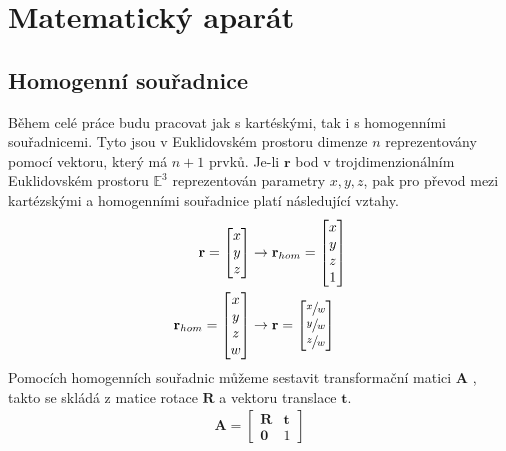 \documentclass[twoside]{ctuthesis}
\newcommand{\tl}[1]{$\mathbf{#1}$}
\begin{document}
\maketitle

\chapter{Matematický aparát}
\section{Homogenní souřadnice}
Během celé práce budu pracovat jak s kartéskými, tak i s homogenními souřadnicemi. Tyto jsou v Euklidovském prostoru dimenze $n$ reprezentovány pomocí vektoru, který má $n+1$ prvků. Je-li $\boldsymbol{r}$ bod v trojdimenzionálním Euklidovském prostoru $\mathbb{E}^3$ reprezentován parametry $x,y,z$, pak pro převod mezi kartézskými a homogenními souřadnice platí následující vztahy.
\begin{align}
    \mathbf{r} = \begin{bmatrix} x \\ y \\ z \end{bmatrix} &\rightarrow \mathbf{r}_{hom} = \begin{bmatrix} x \\ y \\ z \\ 1 \end{bmatrix} \\
    \mathbf{r}_{hom} = \begin{bmatrix} x \\ y \\ z \\ w \end{bmatrix} &\rightarrow \mathbf{r} = \begin{bmatrix} \sfrac{x}{w} \\ \sfrac{y}{w} \\ \sfrac{z}{w} \end{bmatrix}
\end{align}
Pomocích homogenních souřadnic můžeme sestavit transformační matici \tl{A} , takto se skládá z matice rotace \tl{R} a vektoru translace \tl{t}.
\begin{align}
    \mathbf{A} = \begin{bmatrix} \mathbf{R} & \mathbf{t} \\ \mathbf{0} & 1 \end{bmatrix}
\end{align}
\end{document}
